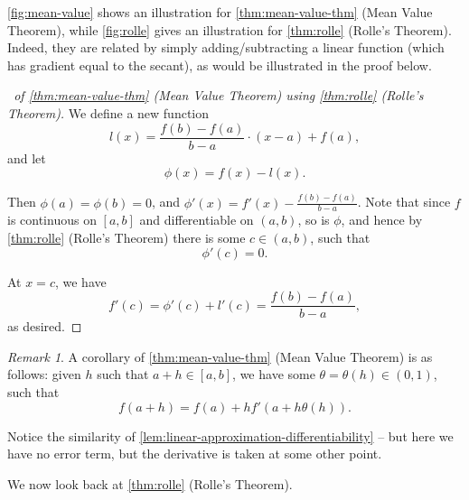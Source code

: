 \documentclass[11pt]{article}
\numberwithin{equation}{section}
\theoremstyle{definition}
\theoremstyle{remark}
\newtheorem{remark}[theorem]{Remark}
\newcommand{\pqty}[1]{\left(#1\right)}
\newcommand{\ccintv}[2]{[#1,#2]}
\newcommand{\oointv}[2]{(#1,#2)}
\begin{document}
\autoref{fig:mean-value} shows an illustration for \autoref{thm:mean-value-thm} (Mean Value Theorem), while \autoref{fig:rolle} gives an illustration for \autoref{thm:rolle} (Rolle's Theorem). Indeed, they are related by simply adding/subtracting a linear function (which has gradient equal to the secant), as would be illustrated in the proof below.

\begin{proof}[\proofname\ of \autoref{thm:mean-value-thm} (Mean Value Theorem) using \autoref{thm:rolle} (Rolle's Theorem)]
    We define a new function
    \[
        l\pqty{x} = \frac{f\pqty{b} - f\pqty{a}}{b - a} \cdot \pqty{x - a} + f\pqty{a},
    \]
    and let
    \[
        \phi\pqty{x} = f\pqty{x} - l\pqty{x}.
    \]

    Then \(\phi\pqty{a} = \phi\pqty{b} = 0\), and \(\phi'\pqty{x} = f'\pqty{x} - \frac{f\pqty{b} - f\pqty{a}}{b - a}\). Note that since \(f\) is continuous on \(\ccintv{a}{b}\) and differentiable on \(\oointv{a}{b}\), so is \(\phi\), and hence by \autoref{thm:rolle} (Rolle's Theorem) there is some \(c \in \oointv{a}{b}\), such that
    \[
        \phi'\pqty{c} = 0.
    \]

    At \(x = c\), we have
    \[
        f'\pqty{c} = \phi'\pqty{c} + l'\pqty{c} = \frac{f\pqty{b} - f\pqty{a}}{b - a},
    \]
    as desired.
\end{proof}

\begin{remark}\label{analysis-unit-0113}
    A corollary of \autoref{thm:mean-value-thm} (Mean Value Theorem) is as follows: given \(h\) such that \(a + h \in \ccintv{a}{b}\), we have some \(\theta = \theta\pqty{h} \in \oointv{0}{1}\), such that
    \[
        f\pqty{a + h} = f\pqty{a} + h f'\pqty{a + h \theta \pqty{h}}.
    \]

    Notice the similarity of \autoref{lem:linear-approximation-differentiability} -- but here we have no error term, but the derivative is taken at some other point.
\end{remark}

We now look back at \autoref{thm:rolle} (Rolle's Theorem).
\end{document}
